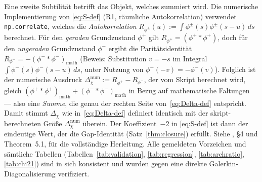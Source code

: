 \documentclass[10pt,twocolumn]{article}
\theoremstyle{definition}
\theoremstyle{remark}
\newcommand{\chifn}{\chi}
\newcommand{\Deltachi}{\Delta_{\chifn}}
\begin{document}
Eine zweite Subtilität betrifft das Objekt, welches summiert wird. Die numerische
Implementierung von \eqref{eq:S-def} (R1, räumliche Autokorrelation)
verwendet \texttt{np.correlate}, welches die \emph{Autokorrelation}
$R_{\phi^\pm}(u):=\int\phi^\pm(s)\phi^\pm(s-u)\,ds$ berechnet.
Für den \emph{geraden} Grundzustand $\phi^+$ gilt
$R_{\phi^+}=(\phi^+{*}\phi^+)$, doch für den \emph{ungeraden} Grundzustand
$\phi^-$ ergibt die Paritätsidentität
$R_{\phi^-}=-(\phi^-{*}\phi^-)_{\mathrm{math}}$ (Beweis: Substitution $v=-s$ im
Integral $\int\phi^-(s)\phi^-(s-u)\,ds$, unter Nutzung von
$\phi^-(-v)=-\phi^-(v)$). Folglich ist der
numerische Ausdruck
$\Deltachi^{\mathrm{num}}:=R_{\phi^+}-R_{\phi^-}$, der vom Skript berechnet wird, gleich
$(\phi^+{*}\phi^+)_{\mathrm{math}}+(\phi^-{*}\phi^-)_{\mathrm{math}}$ in Bezug auf mathematische
Faltungen --- also eine \emph{Summe}, die genau der rechten Seite von~\eqref{eq:Delta-def}
entspricht. Damit stimmt $\Deltachi$ wie in~\eqref{eq:Delta-def} definiert identisch mit der
skript-berechneten Größe $\Deltachi^{\mathrm{num}}$ überein. Der Koeffizient~$-2$ in
\eqref{eq:S-def} ist dann der eindeutige Wert, der die Gap-Identität
(Satz~\ref{thm:closure}) erfüllt. Siehe
\cite{AnalyticKernelV2}, \S4 und Theorem~5.1, für die vollständige
Herleitung. Alle gemeldeten Vorzeichen und sämtliche Tabellen
(Tabellen~\ref{tab:validation}, \ref{tab:regression},
\ref{tab:archratio}, \ref{tab:chi21}) sind in sich konsistent
und wurden gegen eine direkte Galerkin-Diagonalisierung verifiziert.
\end{document}
